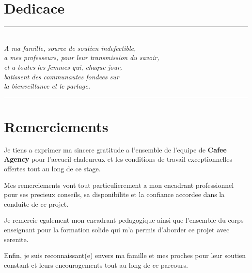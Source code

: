 \documentclass[12pt,a4paper]{report}
\begin{document}
	\chapter*{Dedicace}
	\thispagestyle{fancy}
	\begin{center}
		\vspace*{2cm}
		{\color{primaryPurple}\rule{6cm}{1.5pt}}\\[0.6cm]
		{\large\itshape
			A ma famille, source de soutien indefectible,\\[0.3cm]
			a mes professeurs, pour leur transmission du savoir,\\[0.3cm]
			et a toutes les femmes qui, chaque jour,\\
			batissent des communautes fondees sur\\
			la bienveillance et le partage.\\[0.6cm]
		}
		{\color{primaryPurple}\rule{6cm}{1.5pt}}
	\end{center}
	
	\chapter*{Remerciements}
	\thispagestyle{fancy}
	
	Je tiens a exprimer ma sincere gratitude a l'ensemble de l'equipe de \textbf{Cafee Agency} pour l'accueil chaleureux et les conditions de travail exceptionnelles offertes tout au long de ce stage.
	
	Mes remerciements vont tout particulierement a mon encadrant professionnel pour ses precieux conseils, sa disponibilite et la confiance accordee dans la conduite de ce projet.
	
	Je remercie egalement mon encadrant pedagogique ainsi que l'ensemble du corps enseignant pour la formation solide qui m'a permis d'aborder ce projet avec serenite.
	
	Enfin, je suis reconnaissant(e) envers ma famille et mes proches pour leur soutien constant et leurs encouragements tout au long de ce parcours.
	
	
	\tableofcontents
	\listoffigures
	\listoftables
	
\end{document}
